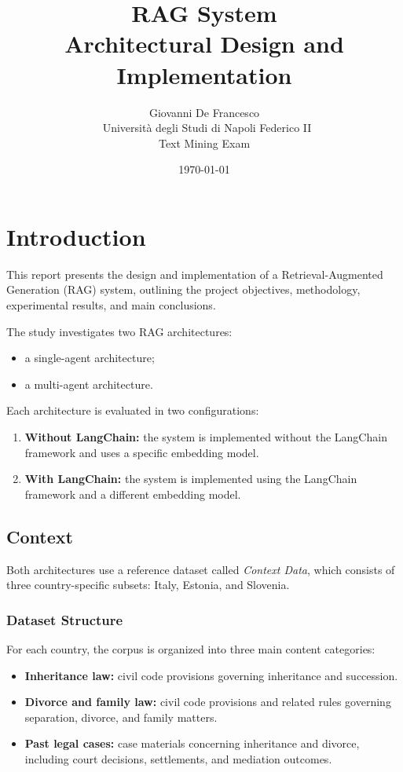 \documentclass[a4paper,12pt]{report}
\title{RAG System \\[0.5cm]
       \large Architectural Design and Implementation}
\author{Giovanni De Francesco \\ \
        \small Università degli Studi di Napoli Federico II \\[0.5cm]
        \small Text Mining Exam}
\date{\today}
\begin{document}
\maketitle

\tableofcontents
\clearpage













\chapter{Introduction}
This report presents the design and implementation of a
Retrieval-Augmented Generation (RAG) system, outlining the project
objectives, methodology, experimental results, and main conclusions.

The study investigates two RAG architectures:
\begin{itemize}
    \item a single-agent architecture;
    \item a multi-agent architecture.
\end{itemize}

Each architecture is evaluated in two configurations:
\begin{enumerate}
    \item \textbf{Without LangChain:} the system is implemented
    without the LangChain framework and uses a specific embedding
    model.
    \item \textbf{With LangChain:} the system is implemented using
    the LangChain framework and a different embedding model.
\end{enumerate}

\section{Context}

Both architectures use a reference dataset called
\textit{Context Data}, which consists of three country-specific
subsets: Italy, Estonia, and Slovenia.

\subsection{Dataset Structure}

For each country, the corpus is organized into three main
content categories:
\begin{itemize}
    \item \textbf{Inheritance law:} civil code provisions governing
    inheritance and succession.
    \item \textbf{Divorce and family law:} civil code provisions
    and related rules governing separation, divorce, and family
    matters.
    \item \textbf{Past legal cases:} case materials concerning
    inheritance and divorce, including court decisions,
    settlements, and mediation outcomes.
\end{itemize}
\end{document}

